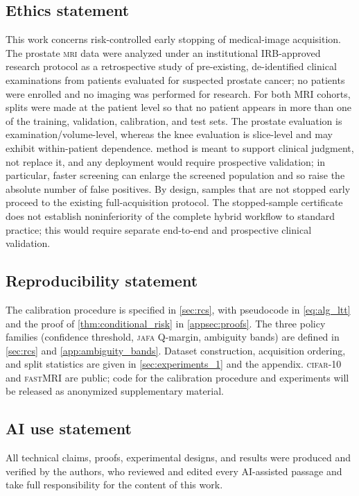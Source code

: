 
\subsection*{Ethics statement}
This work concerns risk-controlled early stopping of medical-image acquisition. The prostate \textsc{mri} data were analyzed under an institutional IRB-approved research protocol as a retrospective study of pre-existing, de-identified clinical examinations from patients evaluated for suspected prostate cancer; no patients were enrolled and no imaging was performed for research. For both MRI cohorts, splits were made at the patient level so that no patient appears in more than one of the training, validation, calibration, and test sets. The prostate evaluation is examination/volume-level, whereas the knee evaluation is slice-level and may exhibit within-patient dependence. \gls{method} is meant to support clinical judgment, not replace it, and any deployment would require prospective validation; in particular, faster screening can enlarge the screened population and so raise the absolute number of false positives. By design, samples that are not stopped early proceed to the existing full-acquisition protocol. The stopped-sample certificate does not establish noninferiority of the complete hybrid workflow to standard practice; this would require separate end-to-end and prospective clinical validation.

\subsection*{Reproducibility statement}
The calibration procedure is specified in \cref{sec:rcs}, with pseudocode in \cref{eq:alg_ltt} and the proof of \cref{thm:conditional_risk} in \cref{appsec:proofs}. The three policy families (confidence threshold, \textsc{jafa} Q-margin, ambiguity bands) are defined in \cref{sec:rcs} and \cref{app:ambiguity_bands}. Dataset construction, acquisition ordering, and split statistics are given in \cref{sec:experiments_1} and the appendix. \textsc{cifar}-10 and \textsc{fastMRI} are public; code for the calibration procedure and experiments will be released as anonymized supplementary material.

\subsection*{AI use statement}
All technical claims, proofs, experimental designs, and results were produced and verified by the authors, who reviewed and edited every AI-assisted passage and take full responsibility for the content of this work.
